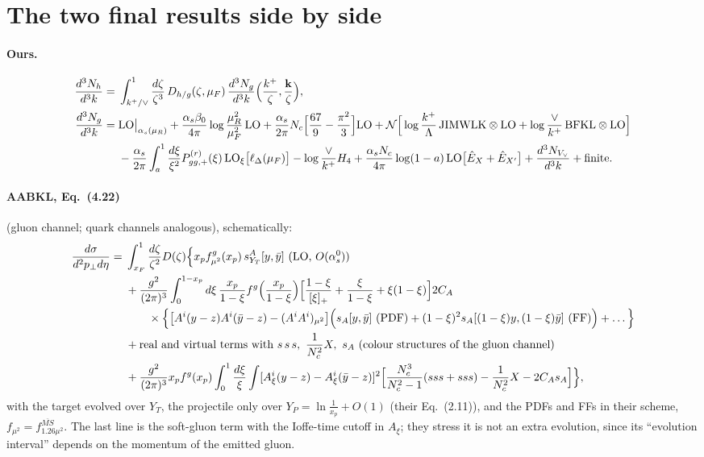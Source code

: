 \documentclass[10pt]{article}
\numberwithin{equation}{section}
\newcommand{\JJ}{{\rm JIMWLK}\otimes{\rm LO}}
\newcommand{\BB}{{\rm BFKL}\otimes{\rm LO}}
\begin{document}
\section{The two final results side by side}
\paragraph{Ours.}
\begin{align}
\frac{d^3N_h}{d^3k}={}&\int_{k^+/\vee}^1\frac{d\zeta}{\zeta^3}\,D_{h/g}(\zeta,\mu_F)\,\frac{d^3N_g}{d^3k}\Big(\frac{k^+}{\zeta},\frac{\mathbf k}{\zeta}\Big),\notag\\
\frac{d^3N_g}{d^3k}={}&{\rm LO}\big|_{\alpha_s(\mu_R)}+\frac{\alpha_s\beta_0}{4\pi}\log\frac{\mu_R^2}{\mu_F^2}\,{\rm LO}+\frac{\alpha_s}{2\pi}N_c\Big[\frac{67}{9}-\frac{\pi^2}{3}\Big]{\rm LO}
+\mathcal N\Big[\log\frac{k^+}{\Lambda}\,\JJ+\log\frac{\vee}{k^+}\,\BB\Big]\notag\\
&-\frac{\alpha_s}{2\pi}\int_{a}^{1}\frac{d\xi}{\xi^2}P^{(r)}_{gg,+}(\xi)\,{\rm LO}_\xi\big[\ell_\Delta(\mu_F)\big]-\log\frac{\vee}{k^+}H_4
+\frac{\alpha_sN_c}{4\pi}\log(1-a)\,{\rm LO}\big[\hat E_X+\hat E_{X'}\big]+\frac{d^3N_{V_\vee}}{d^3k}+\text{finite}.
\label{eq:ours}
\end{align}
\paragraph{AABKL, Eq.~(4.22)} (gluon channel; quark channels analogous), schematically:
\begin{align}
\frac{d\sigma}{d^2p_\perp d\eta}={}&\int_{x_F}^1\frac{d\zeta}{\zeta^2}D(\zeta)\Big\{x_pf^g_{\mu^2}(x_p)\,s^A_{Y_T}[y,\bar y]\ (\text{LO, }O(\alpha_s^0))\notag\\
&+\frac{g^2}{(2\pi)^3}\int_0^{1-x_p}d\xi\,\frac{x_p}{1-\xi}f^g\Big(\frac{x_p}{1-\xi}\Big)\Big[\frac{1-\xi}{[\xi]_+}+\frac{\xi}{1-\xi}+\xi(1-\xi)\Big]2C_A\notag\\
&\qquad\times\Big\{\big[A^i(y-z)A^i(\bar y-z)-(A^iA^i)_{\mu^2}\big]\Big(s_A[y,\bar y]\ \text{(PDF)}+(1-\xi)^2s_A[(1-\xi)y,(1-\xi)\bar y]\ \text{(FF)}\Big)+\dots\Big\}\notag\\
&+\text{real and virtual terms with }s\,s\,s,\ \frac{1}{N_c^2}X,\ s_A\ \text{(colour structures of the gluon channel)}\notag\\
&+\frac{g^2}{(2\pi)^3}x_pf^g(x_p)\int_0^1\frac{d\xi}{\xi}\int[A^i_\xi(y-z)-A^i_\xi(\bar y-z)]^2\Big[\frac{N_c^3}{N_c^2-1}(sss+sss)-\frac{1}{N_c^2}X-2C_As_A\Big]\Big\},
\label{eq:aabkl}
\end{align}
with the target evolved over $Y_T$, the projectile only over $Y_P=\ln\frac{1}{x_p}+O(1)$ (their Eq.~(2.11)), and the PDFs and FFs in their scheme, $f_{\mu^2}=f^{\overline{MS}}_{1.26\mu^2}$. The last line is the soft-gluon term with the Ioffe-time cutoff in $A_\xi$; they stress it is not an extra evolution, since its ``evolution interval'' depends on the momentum of the emitted gluon.
\end{document}
